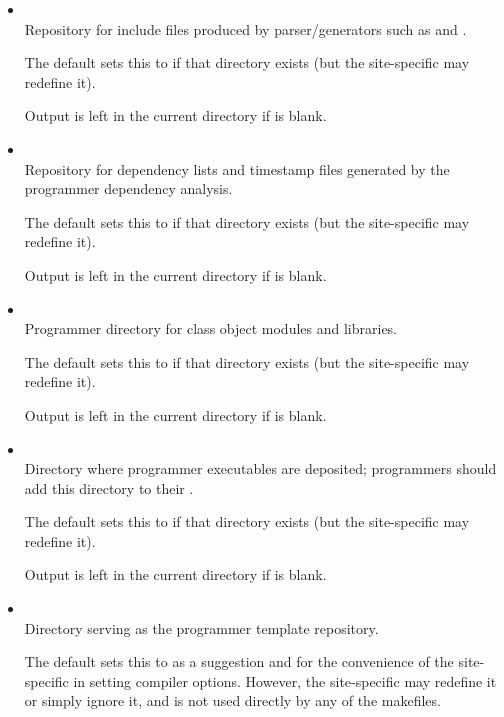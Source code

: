 \begin{itemize}
\item
   \\ Repository for include files produced by parser/generators such as
    and .

   The default  sets this to  if that directory
   exists (but the site-specific  may redefine it).

   Output is left in the current directory if  is blank.

\item
   \\ Repository for dependency lists and timestamp files generated by the
   programmer dependency analysis.

   The default  sets this to  if that
   directory exists (but the site-specific  may redefine it).

   Output is left in the current directory if  is blank.

\item
   \\ Programmer directory for class object modules and libraries.

   The default  sets this to  if that
   directory exists (but the site-specific  may redefine it).

   Output is left in the current directory if  is blank.

\item
   \\ Directory where programmer executables are deposited; programmers should
   add this directory to their .

   The default  sets this to  if that
   directory exists (but the site-specific  may redefine it).

   Output is left in the current directory if  is blank.

\item
   \\ Directory serving as the programmer template repository.

   The default  sets this to  as a
   suggestion and for the convenience of the site-specific  in
   setting compiler options.  However, the site-specific  may
   redefine it or simply ignore it, and  is not used directly
   by any of the makefiles.


\end{itemize}
